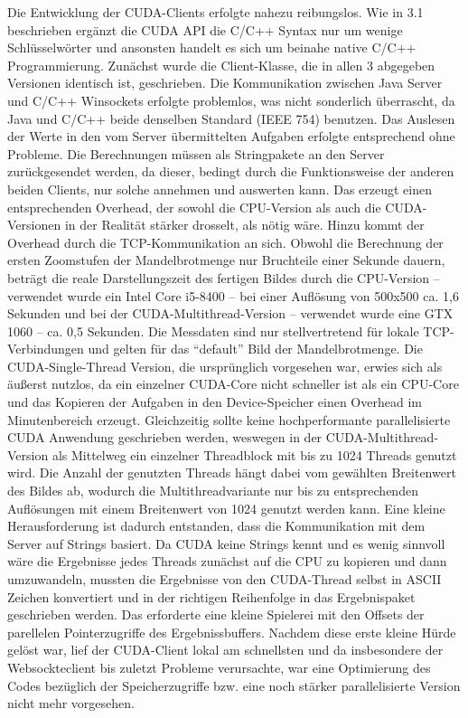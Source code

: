 \documentclass[12pt, onecolumn, notitlepage]{scrartcl}
\begin{document}
Die Entwicklung der CUDA-Clients erfolgte nahezu reibungslos. Wie in 3.1 beschrieben ergänzt die CUDA API die C/C++ Syntax nur um wenige Schlüsselwörter und ansonsten handelt es sich um beinahe native C/C++ Programmierung. 
Zunächst wurde die Client-Klasse, die in allen 3 abgegeben Versionen identisch ist, geschrieben. Die Kommunikation zwischen Java Server und C/C++ Winsockets erfolgte problemlos, was nicht sonderlich überrascht, da Java und C/C++ beide denselben Standard (IEEE 754) benutzen. Das Auslesen der Werte in den vom Server übermittelten Aufgaben erfolgte entsprechend ohne Probleme. Die Berechnungen müssen als Stringpakete an den Server zurückgesendet werden, da dieser, bedingt durch die Funktionsweise der anderen beiden Clients, nur solche annehmen und auswerten kann. Das erzeugt einen entsprechenden Overhead, der sowohl die CPU-Version als auch die CUDA-Versionen in der Realität stärker drosselt, als nötig wäre. Hinzu kommt der Overhead durch die TCP-Kommunikation an sich. Obwohl die Berechnung der ersten Zoomstufen der Mandelbrotmenge nur Bruchteile einer Sekunde dauern, beträgt die reale Darstellungszeit des fertigen Bildes durch die CPU-Version -- verwendet wurde ein Intel Core i5-8400 -- bei einer Auflösung von 500x500 ca. 1,6 Sekunden und bei der CUDA-Multithread-Version -- verwendet wurde eine GTX 1060 -- ca. 0,5 Sekunden. Die Messdaten sind nur stellvertretend für lokale TCP-Verbindungen und gelten für das \enquote{default} Bild der Mandelbrotmenge.
Die CUDA-Single-Thread Version, die ursprünglich vorgesehen war, erwies sich als äußerst nutzlos, da ein einzelner CUDA-Core nicht schneller ist als ein CPU-Core und das Kopieren der Aufgaben in den Device-Speicher einen Overhead im Minutenbereich erzeugt. Gleichzeitig sollte keine hochperformante parallelisierte CUDA Anwendung geschrieben werden, weswegen in der CUDA-Multithread-Version als Mittelweg ein einzelner Threadblock mit bis zu 1024 Threads genutzt wird. Die Anzahl der genutzten Threads hängt dabei vom gewählten Breitenwert des Bildes ab, wodurch die Multithreadvariante nur bis zu entsprechenden Auflösungen mit einem Breitenwert von 1024 genutzt werden kann.
Eine kleine Herausforderung ist dadurch entstanden, dass die Kommunikation mit dem Server auf Strings basiert. Da CUDA keine Strings kennt und es wenig sinnvoll wäre die Ergebnisse jedes Threads zunächst auf die CPU zu kopieren und dann umzuwandeln, mussten die Ergebnisse von den CUDA-Thread selbst in ASCII Zeichen konvertiert und in der richtigen Reihenfolge in das Ergebnispaket geschrieben werden. Das erforderte eine kleine Spielerei mit den Offsets der parellelen Pointerzugriffe des Ergebnissbuffers. Nachdem diese erste kleine Hürde gelöst war, lief der CUDA-Client lokal am schnellsten und da insbesondere der Websockteclient bis zuletzt Probleme verursachte, war eine Optimierung des Codes bezüglich der Speicherzugriffe bzw. eine noch stärker parallelisierte Version nicht mehr vorgesehen. 
\end{document}
